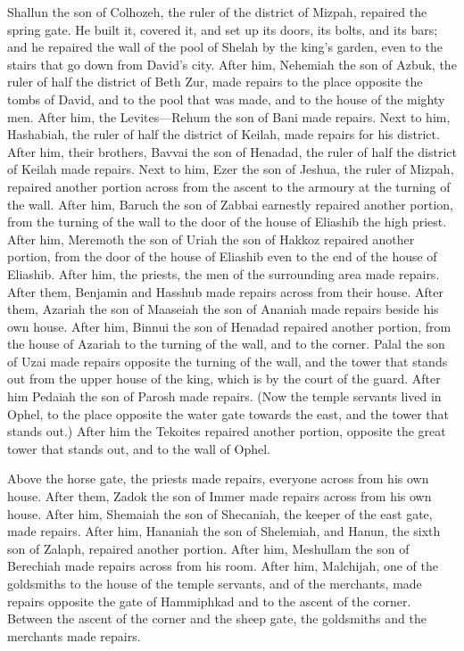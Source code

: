  Shallun the son of Colhozeh, the ruler of the district of
Mizpah, repaired the spring gate. He built it, covered it, and set up
its doors, its bolts, and its bars; and he repaired the wall of the pool
of Shelah by the king's garden, even to the stairs that go down from
David's city.  After him, Nehemiah the son of Azbuk, the
ruler of half the district of Beth Zur, made repairs to the place
opposite the tombs of David, and to the pool that was made, and to the
house of the mighty men.  After him, the Levites---Rehum
the son of Bani made repairs. Next to him, Hashabiah, the ruler of half
the district of Keilah, made repairs for his district. 
After him, their brothers, Bavvai the son of Henadad, the ruler of half
the district of Keilah made repairs.  Next to him, Ezer the
son of Jeshua, the ruler of Mizpah, repaired another portion across from
the ascent to the armoury at the turning of the wall. 
After him, Baruch the son of Zabbai earnestly repaired another portion,
from the turning of the wall to the door of the house of Eliashib the
high priest.  After him, Meremoth the son of Uriah the son
of Hakkoz repaired another portion, from the door of the house of
Eliashib even to the end of the house of Eliashib.  After
him, the priests, the men of the surrounding area made repairs.
 After them, Benjamin and Hasshub made repairs across from
their house. After them, Azariah the son of Maaseiah the son of Ananiah
made repairs beside his own house.  After him, Binnui the
son of Henadad repaired another portion, from the house of Azariah to
the turning of the wall, and to the corner.  Palal the son
of Uzai made repairs opposite the turning of the wall, and the tower
that stands out from the upper house of the king, which is by the court
of the guard. After him Pedaiah the son of Parosh made repairs.
 (Now the temple servants lived in Ophel, to the place
opposite the water gate towards the east, and the tower that stands
out.)  After him the Tekoites repaired another portion,
opposite the great tower that stands out, and to the wall of Ophel.

 Above the horse gate, the priests made repairs, everyone
across from his own house.  After them, Zadok the son of
Immer made repairs across from his own house. After him, Shemaiah the
son of Shecaniah, the keeper of the east gate, made repairs.
 After him, Hananiah the son of Shelemiah, and Hanun, the
sixth son of Zalaph, repaired another portion. After him, Meshullam the
son of Berechiah made repairs across from his room.  After
him, Malchijah, one of the goldsmiths to the house of the temple
servants, and of the merchants, made repairs opposite the gate of
Hammiphkad and to the ascent of the corner.  Between the
ascent of the corner and the sheep gate, the goldsmiths and the
merchants made repairs.

